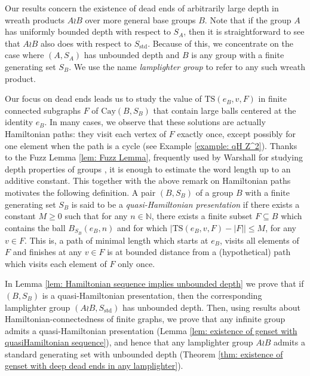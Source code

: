 \documentclass[reqno,oneside]{amsart}
\newcommand{\cay}[2]{\mathrm{Cay}(#1,#2)}
\newcommand{\std}{S_{\mathrm{std}}}
\newcommand{\TS}[3]{\mathrm{TS}\left(#1,#2,#3\right)}
\theoremstyle{plain}
\theoremstyle{definition}
\begin{document}
Our results concern the existence of dead ends of arbitrarily large depth in wreath products $A\wr B$ over more general base groups $B$. Note that if the group $A$ has uniformly bounded depth with respect to $S_A$, then it is straightforward to see that $A\wr B$ also does with respect to $\std$. Because of this, we concentrate on the case where $(A,S_A)$ has unbounded depth and $B$ is any group with a finite generating set $S_B$. We use the name \textit{lamplighter group} to refer to any such wreath product. 


Our focus on dead ends leads us to study the value of $\TS{e_B}{v}{F}$ in finite connected subgraphs $F$ of $\cay{B}{S_B}$ that contain large balls centered at the identity $e_B$. In many cases, we observe that these solutions are actually Hamiltonian paths: they visit each vertex of $F$ exactly once, except possibly for one element when the path is a cycle (see Example \ref{example: qH Z^2}). Thanks to the Fuzz Lemma \ref{lem: Fuzz Lemma}, frequently used by Warshall for studying depth properties of groups \cite{warshall2008strongly,warshall2010deep,warshall2011group}, it is enough to estimate the word length up to an additive constant. This together with the above remark on Hamiltonian paths motivates the following definition.  A pair $(B,S_B)$ of a group $B$ with a finite generating set $S_B$ is said to be a \textit{quasi-Hamiltonian presentation} if there exists a constant $M\ge 0$ such that for any $n\in \mathbb{N}$, there exists a finite subset $F\subseteq B$ which contains the ball $B_{S_B}(e_B,n)$ and for which $|\TS{e_B}{v}{F} - |F||\le M$, for any $v\in F$. This is, a path of minimal length which starts at $e_B$, visits all elements of $F$ and finishes at any $v\in F$ is at bounded distance from a (hypothetical) path which visits each element of $F$ only once. 


In Lemma \ref{lem: Hamiltonian sequence implies unbounded depth} we prove that if $(B,S_B)$ is a quasi-Hamiltonian presentation, then the corresponding lamplighter group $(A\wr B,\std)$ has unbounded depth. Then, using results about Hamiltonian-connectedness of finite graphs, we prove that any infinite group admits a quasi-Hamiltonian presentation (Lemma \ref{lem: existence of genset with quasiHamiltonian sequence}), and hence that any lamplighter group $A\wr B$ admits a standard generating set with unbounded depth (Theorem \ref{thm: existence of genset with deep dead ends in any lamplighter}).
\end{document}
